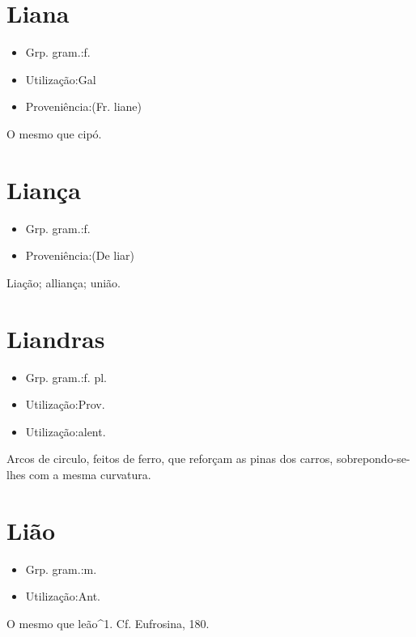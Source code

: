 \section{Liana}
\begin{itemize}
\item {Grp. gram.:f.}
\end{itemize}
\begin{itemize}
\item {Utilização:Gal}
\end{itemize}
\begin{itemize}
\item {Proveniência:(Fr. \textunderscore liane\textunderscore )}
\end{itemize}
O mesmo que \textunderscore cipó\textunderscore .
\section{Liança}
\begin{itemize}
\item {Grp. gram.:f.}
\end{itemize}
\begin{itemize}
\item {Proveniência:(De \textunderscore liar\textunderscore )}
\end{itemize}
Liação; alliança; união.
\section{Liandras}
\begin{itemize}
\item {Grp. gram.:f. pl.}
\end{itemize}
\begin{itemize}
\item {Utilização:Prov.}
\end{itemize}
\begin{itemize}
\item {Utilização:alent.}
\end{itemize}
Arcos de circulo, feitos de ferro, que reforçam as pinas dos carros, sobrepondo-se-lhes com a mesma curvatura.
\section{Lião}
\begin{itemize}
\item {Grp. gram.:m.}
\end{itemize}
\begin{itemize}
\item {Utilização:Ant.}
\end{itemize}
O mesmo que \textunderscore leão\textunderscore ^1. Cf. \textunderscore Eufrosina\textunderscore , 180.
